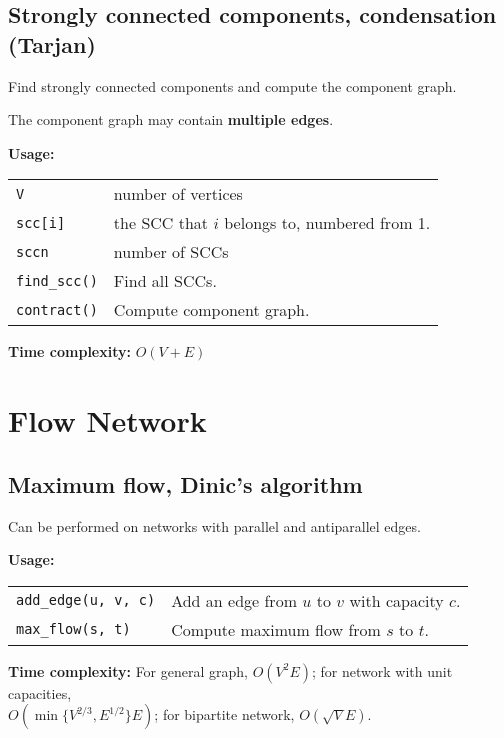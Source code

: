 \subsection{Strongly connected components, condensation (Tarjan)}
Find strongly connected components and compute the component graph. \par
\Warning The component graph may contain \textbf{multiple edges}. \par
\textbf{Usage:} \\[0.1cm]
\begin{tabular}{p{2.5cm} p{9cm}}
  \lstinline|V| & number of vertices \\
  \lstinline|scc[i]| & the SCC that $i$ belongs to, numbered from 1. \\
  \lstinline|sccn| & number of SCCs \\
  \lstinline|find_scc()| & Find all SCCs. \\
  \lstinline|contract()| & Compute component graph. \\
\end{tabular} \par
\textbf{Time complexity:} $O(V + E)$ \par


\section{Flow Network}
\subsection{Maximum flow, Dinic's algorithm}
\Tick Can be performed on networks with parallel and antiparallel edges.\par
\textbf{Usage:} \\[0.1cm]
\begin{tabular}{p{3.5cm} p{8cm}}
  \lstinline|add_edge(u, v, c)| & Add an edge from $u$ to $v$ with capacity $c$. \\
  \lstinline|max_flow(s, t)| & Compute maximum flow from $s$ to $t$. \\
\end{tabular} \par
\textbf{Time complexity:} For general graph, $O(V^2E)$; for network with unit capacities, \\ $O(\min\{V^{2/3}, E^{1/2}\}E)$; for bipartite network, $O(\sqrt{V}E)$. \par


